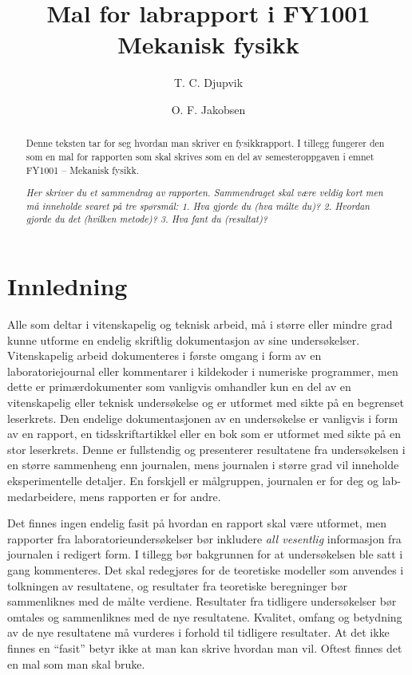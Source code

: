 \documentclass[5p]{elsarticle}
\title{Mal for labrapport i FY1001 Mekanisk fysikk}
\author[fysikk]{T. C. Djupvik}
\author[fysikk]{O. F. Jakobsen}
\begin{document}
\begin{abstract}
Denne teksten tar for seg hvordan man skriver en fysikkrapport. I tillegg fungerer
den som en mal for rapporten som skal skrives som en del av semesteroppgaven i emnet FY1001 – Mekanisk fysikk.

\textit{Her skriver du et sammendrag av rapporten. Sammendraget skal være veldig kort
men må inneholde svaret på tre spørsmål: 1. Hva gjorde du (hva målte du)? 2. Hvordan 
gjorde du det (hvilken metode)? 3. Hva fant du (resultat)?}
\end{abstract}

\maketitle %

\section{Innledning}
Alle som deltar i vitenskapelig og teknisk arbeid, må i større eller mindre
grad kunne utforme en endelig skriftlig dokumentasjon av sine undersøkelser. 
Vitenskapelig arbeid dokumenteres i første omgang i form av en
laboratoriejournal eller kommentarer i kildekoder i numeriske programmer,
men dette er primærdokumenter som vanligvis
omhandler kun en del av en vitenskapelig eller teknisk undersøkelse og
er utformet med sikte på en begrenset leserkrets. Den endelige
dokumentasjonen av en undersøkelse er vanligvis i form av en rapport, en
tidsskriftartikkel eller en bok som er utformet med sikte på en stor
leserkrets. Denne er fullstendig og presenterer resultatene fra
undersøkelsen i en større sammenheng enn journalen, mens journalen i
større grad vil inneholde eksperimentelle detaljer. En forskjell er målgruppen, journalen er for deg og lab-medarbeidere, mens rapporten er for andre.

Det finnes ingen endelig fasit på hvordan en rapport skal være utformet, men
rapporter fra laboratorie\-under\-søkelser bør inkludere \emph{all vesentlig} informasjon
fra journalen i redigert form. I tillegg bør bakgrunnen for at undersøkelsen ble
satt i gang kommenteres. Det skal redegjøres for de teoretiske modeller som anvendes
i tolkningen av resultatene, og resultater fra teoretiske beregninger bør sammenliknes 
med de målte verdiene. Resultater fra tidligere undersøkelser bør omtales og
sammenliknes med de nye resultatene. Kvalitet, omfang og betydning av de nye resultatene
må vurderes i forhold til tidligere resultater. 
At det ikke finnes en ``fasit'' betyr ikke at man kan skrive hvordan man vil. Oftest finnes det en mal som man skal bruke. 
\end{document}
